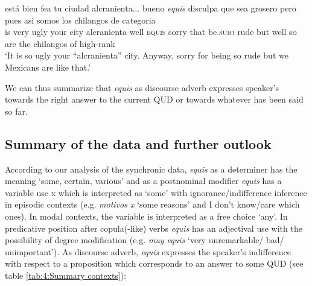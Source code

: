 \documentclass[output=paper
,modfonts
,nonflat]{langsci/langscibook}
\begin{document}
\ea
\gll está bien fea tu ciudad alcranienta... bueno \textit{equis} disculpa que sea grosero pero pues asi somos los chilangos de categoria\\
is very ugly your city alcranienta well \textsc{equis} sorry that be.\textsc{subj} rude but well so are the chilangos of high-rank\\
\glt ‘It is so ugly your “alcranienta” city. Anyway, sorry for being so rude but we Mexicans are like that.’
\z

We can thus summarize that \textit{equis} as discourse adverb expresses speaker’s towards the right answer to the current QUD or towards whatever has been said so far.

\subsection{Summary of the data and further outlook}\label{sec:kellert:2.5}
According to our analysis of the synchronic data, \textit{equis} as a determiner has the meaning ‘some, certain, various’ and as a postnominal modifier \textit{equis} has a variable use x which is interpreted as ‘some’ with ignorance/indifference inference in episodic contexts (e.g. \textit{motivos x} ‘some reasons’ and I don’t know/care which ones). In modal contexts, the variable is interpreted as a free choice ‘any’. In predicative position after copula(-like) verbs \textit{equis} has an adjectival use with the possibility of degree modification (e.g. \textit{muy equis} ‘very unremarkable/ bad/ unimportant’). As discourse adverb, \textit{equis} expresses the speaker’s indifference with respect to a proposition which corresponds to an answer to some QUD (see table \ref{tab:4:Summary contexts}):
\end{document}
